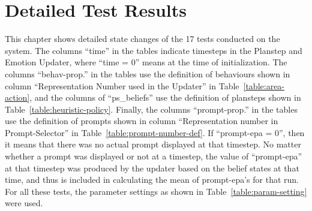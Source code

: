 
\chapter{Detailed Test Results}
\label{chap:appendix}

This chapter shows detailed state changes of the 17 tests conducted on the system. The columns ``time'' in the tables indicate timesteps in the Planstep and Emotion Updater, where ``time = 0'' means at the time of initialization. The columns ``behav-prop.'' in the tables use the definition of behaviours shown in column ``Representation Number used in the Updater'' in Table~\ref{table:area-action}, and the columns of ``ps\_beliefs'' use the definition of plansteps shown in Table~\ref{table:heuristic-policy}. Finally, the columns ``prompt-prop.'' in the tables use the definition of prompts shown in column ``Representation number in Prompt-Selector'' in Table~\ref{table:prompt-number-def}. If ``prompt-epa = 0'', then it means that there was no actual prompt displayed at that timestep. No matter whether a prompt was displayed or not at a timestep, the value of ``prompt-epa'' at that timestep was produced by the updater based on the belief states at that time, and thus is included in calculating the mean of prompt-epa's for that run. For all these tests, the parameter settings as shown in Table~\ref{table:param-setting} were used.




